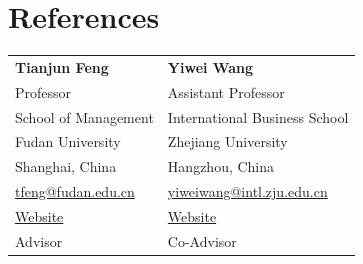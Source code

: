 \section*{References}

\begin{tabularx}{\textwidth}{@{}X X@{}}
\textbf{Tianjun Feng} & \textbf{Yiwei Wang} \\
Professor & Assistant Professor \\
School of Management & International Business School \\
Fudan University & Zhejiang University \\
Shanghai, China & Hangzhou, China \\
\href{mailto:tfeng@fudan.edu.cn}{tfeng@fudan.edu.cn} & \href{mailto:yiweiwang@intl.zju.edu.cn}{yiweiwang@intl.zju.edu.cn} \\
\href{https://www.fdsm.fudan.edu.cn/AboutUs/preview.html?uid=012067}{Website} & \href{https://sites.google.com/view/yiweiwang/}{Website} \\
Advisor & Co-Advisor \\
\end{tabularx}

